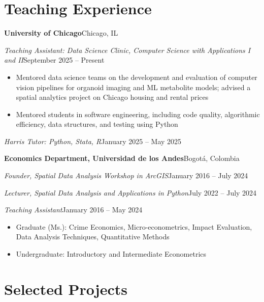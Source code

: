 \documentclass[10pt]{article}
\newcommand{\org}[2]{\noindent\textbf{#1}\hfill #2\par\vspace{0pt}}
\newcommand{\role}[2]{\noindent\textit{#1}\hfill #2\par\vspace{0pt}}
\newenvironment{cvitems}{%
  \begin{itemize}[
    leftmargin=1.2em,
    itemsep=0pt,
    parsep=0pt,
    topsep=1pt,
    label={$\bullet$}]%
}{\end{itemize}}
\newcommand{\entrygap}{\vspace{6pt}}
\begin{document}
\section{Teaching Experience}

\org{University of Chicago}{Chicago, IL}
\role{Teaching Assistant: Data Science Clinic, Computer Science with Applications I and II}{September 2025 – Present}
\vspace{-1pt}
\begin{cvitems}
  \item Mentored data science teams on the development and evaluation of computer vision pipelines for organoid imaging and ML metabolite models; advised a spatial analytics project on Chicago housing and rental prices
  \item Mentored students in software engineering, including code quality, algorithmic efficiency, data structures, and testing using Python
\end{cvitems}
\role{Harris Tutor: Python, Stata, R}{January 2025 – May 2025}

\entrygap

\org{Economics Department, Universidad de los Andes}{Bogotá, Colombia}
\role{Founder, Spatial Data Analysis Workshop in ArcGIS}{January 2016 – July 2024}
\role{Lecturer, Spatial Data Analysis and Applications in Python}{July 2022 – July 2024}
\role{Teaching Assistant}{January 2016 – May 2024}
\vspace{-1pt}
\begin{cvitems}
  \item Graduate (Ms.): Crime Economics, Micro-econometrics, Impact Evaluation, Data Analysis Techniques, Quantitative Methods
  \item Undergraduate: Introductory and Intermediate Econometrics
\end{cvitems}

\section{Selected Projects}
\end{document}
